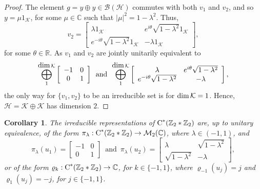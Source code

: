 \documentclass{amsart}
\newtheorem{corollary}[theorem]{Corollary}
\theoremstyle{definition}
\theoremstyle{remark}
\newcommand{\B}{\mathcal{B}}
\renewcommand{\H}{\mathcal{H}}
\newcommand{\K}{\mathcal K}
\newcommand{\M}{\mathcal{M}}
\newcommand\cstar{{\textrm C}^*}                              %
\numberwithin{equation}{section}
\begin{document}
\begin{proof}
	The element $g=y\oplus y\in\B(\H)$ commutes with both $v_1$ and $v_2$,
	and so $y=\mu 1_\K$, for some $\mu\in\mathbb C$ such that $|\mu|^2=1-\lambda^2$. 
	Thus,
	\[
	v_2=\left[\begin{array}{cc} \lambda 1_\K & e^{i\theta}\sqrt{1-\lambda^2} 1_\K \\ e^{-i\theta}\sqrt{1-\lambda^2}1_\K & -\lambda 1_\K\end{array}\right],
	\]
	for some $\theta\in\mathbb R$.
As $v_1$ and $v_2$ are jointly unitarily equivalent to
	\[
	\bigoplus_1^{\mbox{\textrm dim}\,\K}\left[ \begin{array}{cc}-1 &0 \\ 0 & 1\end{array}\right]
	\,\mbox{ and }\,
	\bigoplus_1^{\mbox{\textrm dim}\,\K}
	\left[ \begin{array}{cc}\lambda &e^{i\theta}\sqrt{1-\lambda^2} \\ e^{-i\theta}\sqrt{1-\lambda^2} & -\lambda\end{array}\right],
	\]
	the only way for $\{v_1,v_2\}$ to be an irreducible set is for $\mbox{\textrm dim}\,\K=1$.
	Hence, $\H=\K\oplus\K$ has dimension $2$.
\end{proof}

\begin{corollary}\label{factorial_square} The irreducible representations of $\cstar(\mathbb Z_2 * \mathbb Z_2)$ are, up to unitary equivalence,
	of the form $\pi_\lambda:\cstar(\mathbb Z_2 * \mathbb Z_2)\rightarrow\M_2(\mathbb C)$, where $\lambda\in(-1,1)$, and 
	\[
	\pi_\lambda(u_1)=\left[ \begin{array}{cc}-1 &0 \\ 0 & 1\end{array}\right]\,\mbox{ and }\,
	\pi_\lambda(u_2)=\left[ \begin{array}{cc}\lambda &\sqrt{1-\lambda^2} \\ \sqrt{1-\lambda^2} & -\lambda\end{array}\right],
	\]
	or of the form $\varrho_{k}:\cstar(\mathbb Z_2 * \mathbb Z_2)\rightarrow\mathbb C$, for $k\in\{-1,1\}$, where 
	$\varrho_{-1}(u_j)=j$ and $\varrho_1(u_j)=-j$, for $j\in\{-1,1\}$.
\end{corollary}
\end{document}
